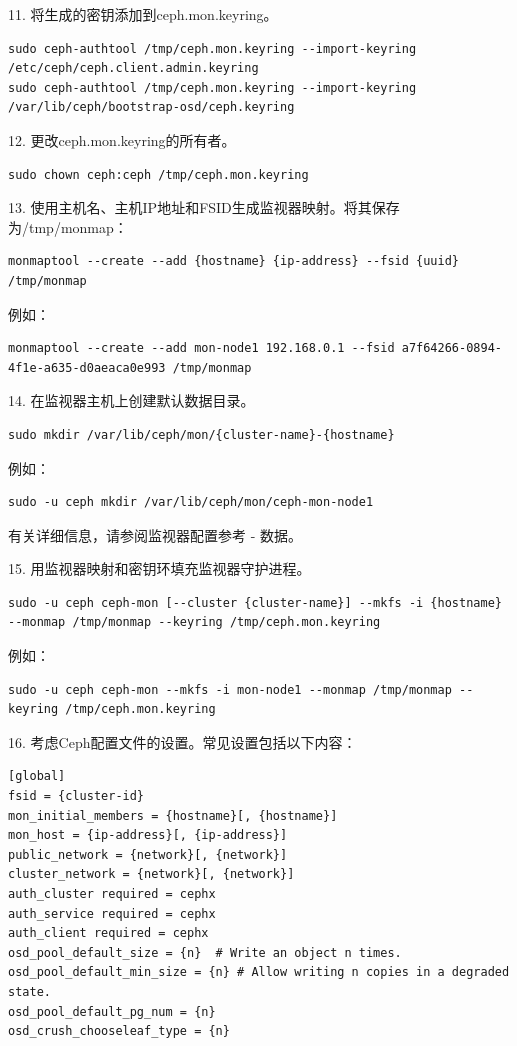 \documentclass[12pt,UTF8]{ctexbook}
\begin{document}
11. 将生成的密钥添加到ceph.mon.keyring。
\begin{verbatim}
sudo ceph-authtool /tmp/ceph.mon.keyring --import-keyring /etc/ceph/ceph.client.admin.keyring
sudo ceph-authtool /tmp/ceph.mon.keyring --import-keyring /var/lib/ceph/bootstrap-osd/ceph.keyring
\end{verbatim}

12. 更改ceph.mon.keyring的所有者。
\begin{verbatim}
sudo chown ceph:ceph /tmp/ceph.mon.keyring
\end{verbatim}

13. 使用主机名、主机IP地址和FSID生成监视器映射。将其保存为/tmp/monmap：
\begin{verbatim}
monmaptool --create --add {hostname} {ip-address} --fsid {uuid} /tmp/monmap
\end{verbatim}

例如：
\begin{verbatim}
monmaptool --create --add mon-node1 192.168.0.1 --fsid a7f64266-0894-4f1e-a635-d0aeaca0e993 /tmp/monmap
\end{verbatim}

14. 在监视器主机上创建默认数据目录。
\begin{verbatim}
sudo mkdir /var/lib/ceph/mon/{cluster-name}-{hostname}
\end{verbatim}

例如：
\begin{verbatim}
sudo -u ceph mkdir /var/lib/ceph/mon/ceph-mon-node1
\end{verbatim}

有关详细信息，请参阅监视器配置参考 - 数据。

15. 用监视器映射和密钥环填充监视器守护进程。
\begin{verbatim}
sudo -u ceph ceph-mon [--cluster {cluster-name}] --mkfs -i {hostname} --monmap /tmp/monmap --keyring /tmp/ceph.mon.keyring
\end{verbatim}

例如：
\begin{verbatim}
sudo -u ceph ceph-mon --mkfs -i mon-node1 --monmap /tmp/monmap --keyring /tmp/ceph.mon.keyring
\end{verbatim}

16. 考虑Ceph配置文件的设置。常见设置包括以下内容：
\begin{verbatim}
[global]
fsid = {cluster-id}
mon_initial_members = {hostname}[, {hostname}]
mon_host = {ip-address}[, {ip-address}]
public_network = {network}[, {network}]
cluster_network = {network}[, {network}]
auth_cluster required = cephx
auth_service required = cephx
auth_client required = cephx
osd_pool_default_size = {n}  # Write an object n times.
osd_pool_default_min_size = {n} # Allow writing n copies in a degraded state.
osd_pool_default_pg_num = {n}
osd_crush_chooseleaf_type = {n}
\end{verbatim}
\end{document}
